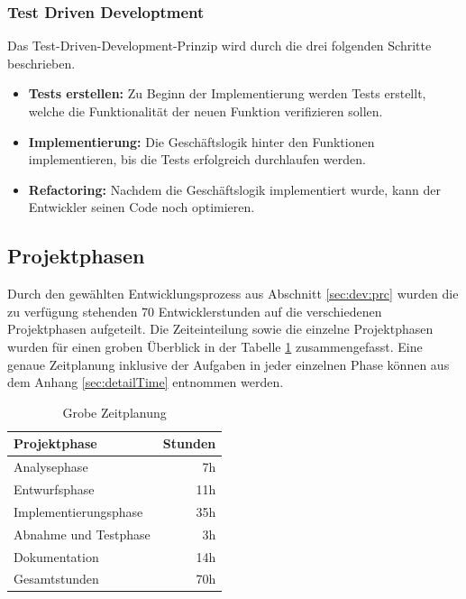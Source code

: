 \documentclass[10pt, oneside, ngerman]{article}
\begin{document}
    \subsubsection{Test Driven Developtment}
      Das Test-Driven-Development-Prinzip wird durch die drei folgenden Schritte beschrieben.
        \begin{itemize}
          \item \textbf{Tests erstellen:} Zu Beginn der Implementierung werden Tests erstellt, welche die Funktionalität der neuen Funktion verifizieren sollen.
          \item \textbf{Implementierung:} Die Geschäftslogik hinter den Funktionen implementieren, bis die Tests erfolgreich durchlaufen werden.
          \item \textbf{Refactoring:} Nachdem die Geschäftslogik implementiert wurde, kann der Entwickler seinen Code noch optimieren. 
        \end{itemize}
  \subsection{Projektphasen}\label{sec:plan:phase}
    Durch den gewählten Entwicklungsprozess aus Abschnitt \ref{sec:dev:prc} wurden die zu verfügung stehenden 70 Entwicklerstunden auf die verschiedenen Projektphasen aufgeteilt.
    Die Zeiteinteilung sowie die einzelne Projektphasen wurden für einen groben Überblick in der Tabelle \ref{tab:timing:overview} zusammengefasst.
    Eine genaue Zeitplanung inklusive der Aufgaben in jeder einzelnen Phase können aus dem Anhang \ref{sec:detailTime} entnommen werden. 
    \begin{table}[ht]
      
      \centering
    \begin{tabular}{| l | r |}
      \hline
      \rowcolor{carolinablue}
      Projektphase & Stunden \\
      \hline
      Analysephase & 7h \\
      \hline
      \rowcolor{lightgray}
      Entwurfsphase & 11h\\
      \hline
      Implementierungsphase & 35h\\
      \hline
      \rowcolor{lightgray}
      Abnahme und Testphase & 3h\\
      \hline
      Dokumentation & 14h \\
      \hline
      \rowcolor{carolinablue}
      Gesamtstunden & 70h\\
      \hline
    \end{tabular}
    \caption{Grobe Zeitplanung}
    \label{tab:timing:overview}
  \end{table}  
\end{document}
